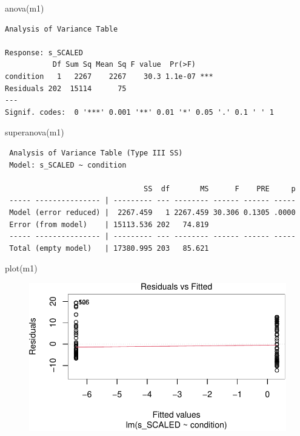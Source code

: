 \documentclass[
  letterpaper,
  DIV=11,
  numbers=noendperiod]{scrreprt}
\newenvironment{Shaded}{\begin{snugshade}}{\end{snugshade}}
\newcommand{\FunctionTok}[1]{\textcolor[rgb]{0.28,0.35,0.67}{#1}}
\newcommand{\NormalTok}[1]{\textcolor[rgb]{0.00,0.23,0.31}{#1}}
\begin{document}
\begin{Shaded}
\begin{Highlighting}[]
\FunctionTok{anova}\NormalTok{(m1)}
\end{Highlighting}
\end{Shaded}

\begin{verbatim}
Analysis of Variance Table

Response: s_SCALED
           Df Sum Sq Mean Sq F value  Pr(>F)    
condition   1   2267    2267    30.3 1.1e-07 ***
Residuals 202  15114      75                    
---
Signif. codes:  0 '***' 0.001 '**' 0.01 '*' 0.05 '.' 0.1 ' ' 1
\end{verbatim}

\begin{Shaded}
\begin{Highlighting}[]
\FunctionTok{superanova}\NormalTok{(m1)}
\end{Highlighting}
\end{Shaded}

\begin{verbatim}
 Analysis of Variance Table (Type III SS)
 Model: s_SCALED ~ condition

                                SS  df       MS      F    PRE     p
 ----- --------------- | --------- --- -------- ------ ------ -----
 Model (error reduced) |  2267.459   1 2267.459 30.306 0.1305 .0000
 Error (from model)    | 15113.536 202   74.819                    
 ----- --------------- | --------- --- -------- ------ ------ -----
 Total (empty model)   | 17380.995 203   85.621                    
\end{verbatim}

\begin{Shaded}
\begin{Highlighting}[]
\FunctionTok{plot}\NormalTok{(m1)}
\end{Highlighting}
\end{Shaded}

\begin{figure}[H]

{\centering \includegraphics{analysis/SGC3A/5_sgc3A_exploration_files/figure-pdf/unnamed-chunk-10-1.pdf}

}

\end{figure}
\end{document}

